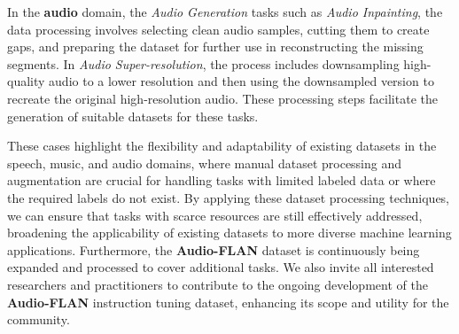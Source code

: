 In the \textbf{audio} domain, the \textit{Audio Generation} tasks such as \textit{Audio Inpainting}, the data processing involves selecting clean audio samples, cutting them to create gaps, and preparing the dataset for further use in reconstructing the missing segments. In \textit{Audio Super-resolution}, the process includes downsampling high-quality audio to a lower resolution and then using the downsampled version to recreate the original high-resolution audio. These processing steps facilitate the generation of suitable datasets for these tasks.



These cases highlight the flexibility and adaptability of existing datasets in the speech, music, and audio domains, where manual dataset processing and augmentation are crucial for handling tasks with limited labeled data or where the required labels do not exist. By applying these dataset processing techniques, we can ensure that tasks with scarce resources are still effectively addressed, broadening the applicability of existing datasets to more diverse machine learning applications. Furthermore, the \textbf{Audio-FLAN} dataset is continuously being expanded and processed to cover additional tasks. We also invite all interested researchers and practitioners to contribute to the ongoing development of the \textbf{Audio-FLAN} instruction tuning dataset, enhancing its scope and utility for the community.


